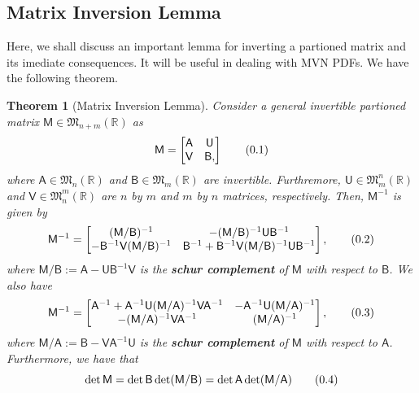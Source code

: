 \documentclass[10pt]{article}
\newtheorem{thm}{Theorem}[section]
\theoremstyle{definition}
\newcommand\eqnum{\addtocounter{equation}{1}\tag{\arabic{section}.\arabic{equation}}}
\begin{document}
\subsection{Matrix Inversion Lemma}
Here, we shall discuss an important lemma for inverting a partioned matrix and its imediate consequences. It will be useful in dealing with MVN PDFs. We have the following theorem.
\begin{thm}[Matrix Inversion Lemma]\label{thm:MIL}
Consider a general invertible partioned matrix $\mathsf{M}\in\mathfrak{M}_{n+m}(\mathbb{R})$ as
\begin{equation*}
\mathsf{M} =
\begin{bmatrix}
\mathsf{A} & \mathsf{U} \\
\mathsf{V} & \mathsf{B},
\end{bmatrix}
\eqnum
\end{equation*}
where $\mathsf{A}\in\mathfrak{M}_n(\mathbb{R})$ and $\mathsf{B}\in\mathfrak{M}_m(\mathbb{R})$ are invertible. Furthremore, $\mathsf{U}\in\mathfrak{M}^n_m(\mathbb{R})$ and $\mathsf{V}\in\mathfrak{M}^m_n(\mathbb{R})$ are $n$ by $m$ and $m$ by $n$ matrices, respectively. Then, $\mathsf{M}^{-1}$ is given by
\begin{equation*}
\mathsf{M}^{-1} =
\begin{bmatrix}
(\mathsf{M}/\mathsf{B})^{-1} & 
-(\mathsf{M}/\mathsf{B})^{-1}\mathsf{U}\mathsf{B}^{-1} \\
-\mathsf{B}^{-1}\mathsf{V}(\mathsf{M}/\mathsf{B})^{-1} & 
\mathsf{B}^{-1}+\mathsf{B}^{-1}\mathsf{V}(\mathsf{M}/\mathsf{B})^{-1}\mathsf{U}\mathsf{B}^{-1}
\end{bmatrix},
\eqnum
\label{eq:schur:MB}
\end{equation*}
where $\mathsf{M}/\mathsf{B}:=\mathsf{A}-\mathsf{U}\mathsf{B}^{-1}\mathsf{V}$ is the \textbf{schur complement} of $\mathsf{M}$ with respect to $\mathsf{B}$. We also have
\begin{equation*}
\mathsf{M}^{-1} =
\begin{bmatrix}
\mathsf{A}^{-1}+\mathsf{A}^{-1}\mathsf{U}(\mathsf{M}/\mathsf{A})^{-1}\mathsf{V}\mathsf{A}^{-1} & 
-\mathsf{A}^{-1}\mathsf{U} (\mathsf{M}/\mathsf{A})^{-1} \\
-(\mathsf{M}/\mathsf{A})^{-1}\mathsf{V}\mathsf{A}^{-1} & 
(\mathsf{M}/\mathsf{A})^{-1} 
\end{bmatrix},
\eqnum
\label{eq:schur:MA}
\end{equation*}
where $\mathsf{M}/\mathsf{A}:=\mathsf{B}-\mathsf{V}\mathsf{A}^{-1}\mathsf{U}$ is the \textbf{schur complement} of $\mathsf{M}$ with respect to $\mathsf{A}$. Furthermore, we have that
\begin{equation*}
\det\mathsf{M} = \det\mathsf{B}\det(\mathsf{M}/\mathsf{B})= \det\mathsf{A}\det(\mathsf{M}/\mathsf{A})
\eqnum
\label{eq:schur:det}
\end{equation*}
\end{thm}
\end{document}
